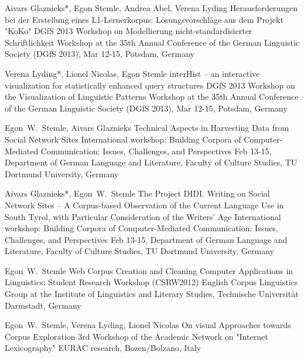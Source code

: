 \documentclass[10pt,a4paper,sans]{moderncv}
\begin{document}
        {Aivars Glaznieks*, Egon Stemle, Andrea Abel, Verena Lyding}
        {Herausforderungen bei der Erstellung eines L1-Lernerkorpus:
        Lösungsvorschläge aus dem Projekt "KoKo"}
        {DGfS 2013 Workshop on Modellierung nicht-standardisierter
        Schriftlichkeit}
        {Workshop at the 35th Annual Conference of the German Linguistic
        Society (DGfS 2013), Mar 12-15, Potsdam, Germany}
        {}

        {Verena Lyding*, Lionel Nicolas, Egon Stemle}
        {interHist -- an interactive visualization for statistically
        enhanced query structures}
        {DGfS 2013 Workshop on the Visualization of Linguistic Patterns}
        {Workshop at the 35th Annual Conference of the German Linguistic
        Society (DGfS 2013), Mar 12-15, Potsdam, Germany}
        {}

        {Egon~W.~Stemle, Aivars Glaznieks}
        {Technical Aspects in Harvesting Data from Social Network Sites}
        {International workshop: Building Corpora of Computer-Mediated
        Communication: Issues, Challenges, and Perspectives}
        {Feb 13-15, Department of German Language and Literature, Faculty of
        Culture Studies, TU Dortmund University, Germany}
        {}

        {Aivars Glaznieks*, Egon~W.~Stemle}
        {The Project DIDI. Writing on Social Network Sites -- A
        Corpus-based Observation of the Current Language Use in South Tyrol,
        with Particular Consideration of the Writers’ Age} 
        {International workshop: Building Corpora of Computer-Mediated
        Communication: Issues, Challenges, and Perspectives}
        {Feb 13-15, Department of German Language and Literature, Faculty of
        Culture Studies, TU Dortmund University, Germany}
        {}

        {Egon~W.~Stemle}
        {Web Corpus Creation and Cleaning}
        {Computer Applications in Linguistics: Student Research Workshop (CSRW2012)}
        {English Corpus Linguistics Group at the Institute of
        Linguistics and Literary Studies, Technische Universit\"{a}t Darmstadt, Germany}
        {}

        {Egon~W.~Stemle, Verena Lyding, Lionel Nicolas}
        {On visual Approaches towards Corpus Exploration}
        {3rd Workshop of the Academic Network on "Internet Lexicography"}
        {EURAC research, Bozen/Bolzano, Italy}
        {}
\end{document}
